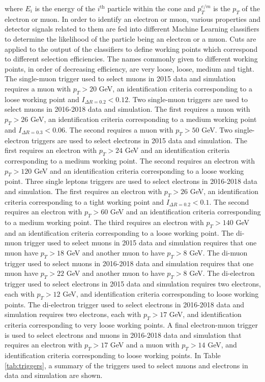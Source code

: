 where $E_{i}$ is the energy of the $i^{\text{th}}$ particle within the cone and $p^{e/m}_{T}$ is the $p_{T}$ of the electron or muon. In order to identify an electron or muon, various properties and detector signals related to them are fed into different Machine Learning classifiers to determine the likelihood of the particle being an electron or a muon. Cuts are applied to the output of the classifiers to define working points which correspond to different selection efficiencies. The names commonly given to different working points, in order of decreasing efficiency, are very loose, loose, medium and tight. The single-muon trigger used to select muons in 2015 data and simulation requires a muon with $p_{T} > 20$ GeV, an identification criteria corresponding to a loose working point and $I_{\Delta R = 0.2} < 0.12$. Two single-muon triggers are used to select muons in 2016-2018 data and simulation. The first requires a muon with $p_{T} > 26$ GeV, an identification criteria corresponding to a medium working point and $I_{\Delta R = 0.3} < 0.06$. The second requires a muon with $p_{T} > 50$ GeV. Two single-electron triggers are used to select electrons in 2015 data and simulation. The first requires an electron with $p_{T} > 24$ GeV and an identification criteria corresponding to a medium working point. The second requires an electron with $p_{T} > 120$ GeV and an identification criteria corresponding to a loose working point. Three single leptons triggers are used to select electrons in 2016-2018 data and simulation. The first requires an electron with $p_{T}>26$ GeV, an identification criteria corresponding to a tight working point and $I_{\Delta R = 0.2} < 0.1$. The second requires an electron with $p_{T} > 60$ GeV and an identification criteria corresponding to a medium working point. The third requires an electron with $p_{T} > 140$ GeV and an identification criteria corresponding to a loose working point. The di-muon trigger used to select muons in 2015 data and simulation requires that one muon have $p_{T}> 18$ GeV and another muon to have $p_{T}> 8$ GeV. The di-muon trigger used to select muons in 2016-2018 data and simulation requires that one muon have $p_{T}> 22$ GeV and another muon to have $p_{T}> 8$ GeV. The di-electron trigger used to select electrons in 2015 data and simulation requires two electrons, each with $p_{T} > 12$ GeV, and identification criteria corresponding to loose working points. The di-electron trigger used to select electrons in 2016-2018 data and simulation requires two electrons, each with $p_{T} > 17$ GeV, and identification criteria corresponding to very loose working points. A final electron-muon trigger is used to select electrons and muons in 2016-2018 data and simulation that requires an electron with $p_{T} > 17$ GeV and a muon with $p_{T} > 14$ GeV, and identification criteria corresponding to loose working points. In Table \ref{tab:triggers}, a summary of the triggers used to select muons and electrons in data and simulation are shown.



